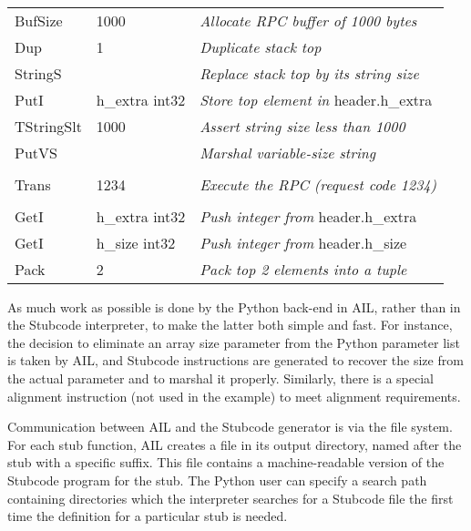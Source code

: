 {\tt
\begin{tabular}{l l l}
BufSize     & 1000            & {\em Allocate RPC buffer of 1000 bytes}    \\
Dup         & 1               & {\em Duplicate stack top}                  \\
StringS     &                 & {\em Replace stack top by its string size} \\
PutI        & h\_extra int32  & {\em Store top element in }header.h\_extra \\
TStringSlt  & 1000            & {\em Assert string size less than 1000}    \\
PutVS       &                 & {\em Marshal variable-size string}         \\
            &                 &                                            \\
Trans       & 1234            & {\em Execute the RPC (request code 1234)}  \\
            &                 &                                            \\
GetI        & h\_extra int32  & {\em Push integer from} header.h\_extra    \\
GetI        & h\_size int32   & {\em Push integer from} header.h\_size     \\
Pack        & 2               & {\em Pack top 2 elements into a tuple}     \\
\end{tabular}
}
\vspace{1em}

As much work as possible is done by the Python back-end in AIL, rather
than in the Stubcode interpreter, to make the latter both simple and
fast.  For instance, the decision to eliminate an array size parameter
from the Python parameter list is taken by AIL, and Stubcode
instructions are generated to recover the size from the actual
parameter and to marshal it properly.  Similarly, there is a special
alignment instruction (not used in the example) to meet alignment
requirements.

Communication between AIL and the Stubcode generator is via the file
system.  For each stub function, AIL creates a file in its output
directory, named after the stub with a specific suffix.  This file
contains a machine-readable version of the Stubcode program for the
stub.  The Python user can specify a search path containing
directories which the interpreter searches for a Stubcode file the
first time the definition for a particular stub is needed.

